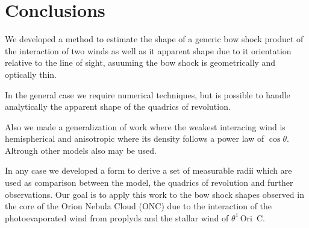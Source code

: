 \section{Conclusions}
\label{sec:conc}

\newcommand\thC{\(\theta^1\)\,Ori~C}

We developed a method to estimate the shape of a generic bow shock product of the
interaction of two winds as well as it apparent shape due to it orientation relative to the line of sight, asuuming
the bow shock is geometrically and optically thin.

In the general case we require numerical techniques, but is possible to handle analytically the apparent shape of
the quadrics of revolution. 

Also we made a generalization of \CRW{} work where the weakest interacing wind is hemispherical and anisotropic where its
density follows a power law of $\cos\theta$. Altrough other models also may be used.

In any case we developed a form to derive a set of measurable radii which are used as comparison between the \CRW{} model, the quadrics
of revolution and further observations. Our goal is to apply this work to the bow shock shapes observed in the core of the Orion Nebula Cloud
(ONC) due to the interaction of the photoevaporated wind from proplyds and the stallar wind of \thC{}.



